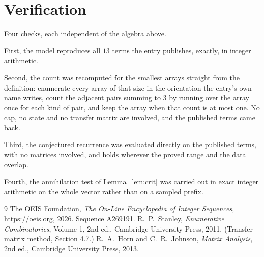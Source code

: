 \documentclass[11pt,a4paper]{article}
\theoremstyle{plain}
\theoremstyle{definition}
\begin{document}
\section{Verification}

Four checks, each independent of the algebra above.

First, the model reproduces all $13$ terms the entry publishes, exactly, in integer
arithmetic.

Second, the count was recomputed for the smallest arrays straight from the definition:
enumerate every array of that size in the orientation the entry's own name writes, count the
adjacent pairs summing to $3$ by running over the array once for each kind of pair, and keep
the array when that count is at most one. No cap, no state and no transfer matrix are involved, and
the published terms came back.

Third, the conjectured recurrence was evaluated directly on the published terms, with no
matrices involved, and holds wherever the proved range and the data overlap.

Fourth, the annihilation test of Lemma~\ref{lem:crit} was carried out in exact integer
arithmetic on the whole vector rather than on a sampled prefix.

\begin{thebibliography}{9}
 The OEIS Foundation, \emph{The On-Line Encyclopedia of Integer
Sequences}, \url{https://oeis.org}, 2026. Sequence A269191.
 R.~P.~Stanley, \emph{Enumerative Combinatorics}, Volume 1, 2nd ed.,
Cambridge University Press, 2011. (Transfer-matrix method, Section 4.7.)
 R.~A.~Horn and C.~R.~Johnson, \emph{Matrix Analysis}, 2nd ed., Cambridge
University Press, 2013.
\end{thebibliography}
\end{document}
